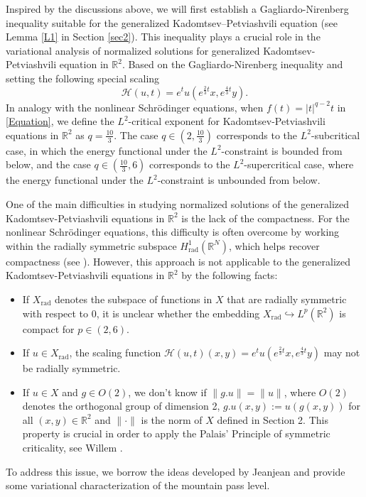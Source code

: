 \documentclass[11pt]{amsart}
\numberwithin{equation}{section}
\begin{document}
{Inspired by the discussions above, we will first establish a Gagliardo-Nirenberg inequality suitable for the generalized Kadomtsev--Petviashvili equation (see Lemma \ref{L1} in Section \ref{sec2}). This inequality plays a crucial role in the variational analysis of normalized solutions for generalized Kadomtsev-Petviashvili equation in $\mathbb{R}^2$. Based on the Gagliardo-Nirenberg inequality and {setting the following special scaling}
    \[
    \mathcal{H}(u,t) = e^{t} u(e^{\frac{2}{3}t}x, e^{\frac{4}{3}t}y).
    \]
In analogy with the nonlinear Schr\"{o}dinger equations, when $ f(t)=|t|^{q-2}t $ in \eqref{Equation}, we define the $L^2$-critical exponent
for  Kadomtsev-Petviashvili equations in $\mathbb{R}^2$ as $q=\frac{10}{3}$. The case $q \in (2, \frac{10}{3})$ corresponds to the $L^2$-subcritical case, in which the energy functional under the $L^2$-constraint is bounded from below, and the case $q \in (\frac{10}{3}, 6)$ corresponds to  the $L^2$-supercritical case, where the energy functional under the $L^2$-constraint is unbounded from below.


{One of the main difficulties in studying normalized solutions of the generalized Kadomtsev-Petviashvili equations in $\mathbb{R}^2$ is the lack of the compactness. For the nonlinear Schr\"{o}dinger equations, this difficulty is often overcome by working within the radially symmetric subspace $H_{\text{rad}}^1\left(\mathbb{R}^N\right)$, which helps recover compactness (see \cite{Jean}). However, this approach is not applicable to the generalized Kadomtsev-Petviashvili equations in $\mathbb{R}^2$   by the following facts:
\begin{itemize}
	\item[(i)] If  $X_{\text{rad}}$ denotes the subspace of functions in $X$ that are radially symmetric with respect to 0, it is unclear whether  the embedding $X_{\text{rad}} \hookrightarrow L^{p}(\mathbb{R}^2)$ is compact for $p \in (2,6)$.
	\item[(ii)] If $u \in X_{\text{rad}}$, the scaling function $\mathcal{H}(u, t)(x, y) = e^{t}u(e^{\frac{2}{3} t}x, e^{\frac{4}{3} t}y)$ may not be radially symmetric.
	\item[(iii)] If $u \in X$ and $g \in O(2)$, we don't know if $\|g.u\|=\|u\|$, where $O(2)$ denotes  the orthogonal group of dimension 2,  $g.u(x,y):=u(g(x,y))$ for all $(x,y) \in \mathbb{R}^2$ and $\|\cdot \|$ is the norm of $X$ defined in Section 2. This property is crucial in order to apply the Palais' Principle of symmetric criticality, see Willem \cite[Chapter 1, Section 1.6]{Willem}.
\end{itemize}
To address this issue, we borrow the ideas developed by Jeanjean \cite{Jean} and provide some variational characterization of the mountain pass level.

}}
\end{document}
